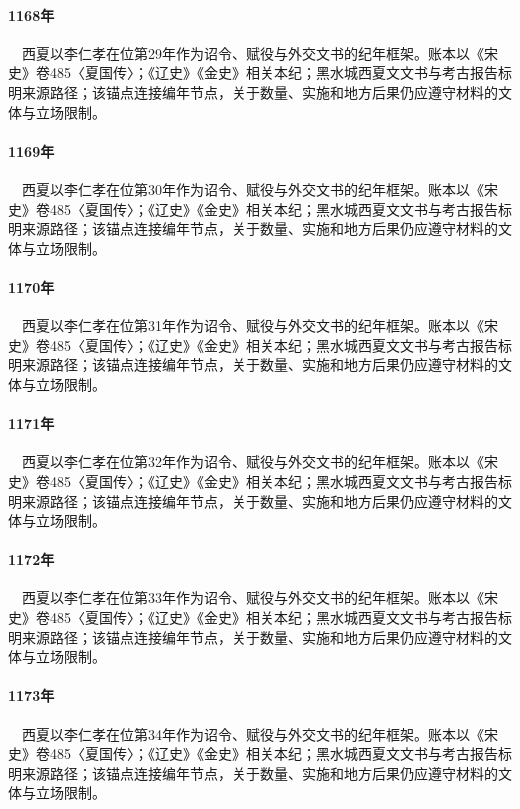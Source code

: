 \paragraph{1168年}　西夏以李仁孝在位第29年作为诏令、赋役与外交文书的纪年框架。账本以《宋史》卷485〈夏国传〉；《辽史》《金史》相关本纪；黑水城西夏文文书与考古报告标明来源路径；该锚点连接编年节点，关于数量、实施和地方后果仍应遵守材料的文体与立场限制。

\paragraph{1169年}　西夏以李仁孝在位第30年作为诏令、赋役与外交文书的纪年框架。账本以《宋史》卷485〈夏国传〉；《辽史》《金史》相关本纪；黑水城西夏文文书与考古报告标明来源路径；该锚点连接编年节点，关于数量、实施和地方后果仍应遵守材料的文体与立场限制。

\paragraph{1170年}　西夏以李仁孝在位第31年作为诏令、赋役与外交文书的纪年框架。账本以《宋史》卷485〈夏国传〉；《辽史》《金史》相关本纪；黑水城西夏文文书与考古报告标明来源路径；该锚点连接编年节点，关于数量、实施和地方后果仍应遵守材料的文体与立场限制。

\paragraph{1171年}　西夏以李仁孝在位第32年作为诏令、赋役与外交文书的纪年框架。账本以《宋史》卷485〈夏国传〉；《辽史》《金史》相关本纪；黑水城西夏文文书与考古报告标明来源路径；该锚点连接编年节点，关于数量、实施和地方后果仍应遵守材料的文体与立场限制。

\paragraph{1172年}　西夏以李仁孝在位第33年作为诏令、赋役与外交文书的纪年框架。账本以《宋史》卷485〈夏国传〉；《辽史》《金史》相关本纪；黑水城西夏文文书与考古报告标明来源路径；该锚点连接编年节点，关于数量、实施和地方后果仍应遵守材料的文体与立场限制。

\paragraph{1173年}　西夏以李仁孝在位第34年作为诏令、赋役与外交文书的纪年框架。账本以《宋史》卷485〈夏国传〉；《辽史》《金史》相关本纪；黑水城西夏文文书与考古报告标明来源路径；该锚点连接编年节点，关于数量、实施和地方后果仍应遵守材料的文体与立场限制。

